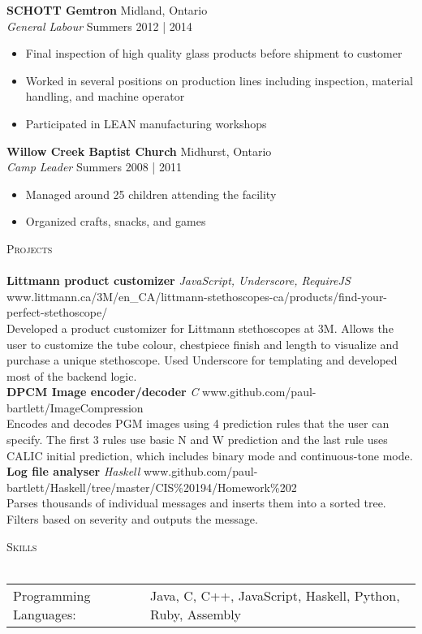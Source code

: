 \documentclass[a4paper]{article}
\newcommand{\lineunder} {
    \vspace*{-8pt} \\
    \hspace*{-18pt} \hrulefill \\
}
\newcommand{\header} [1] {
    {\hspace*{-18pt}\vspace*{6pt} \textsc{#1}}
    \vspace*{-6pt} \lineunder
}
\begin{document}
\textbf{SCHOTT Gemtron} \hfill Midland, Ontario\\
\textit{General Labour} \hfill Summers 2012 | 2014\\
\vspace{-1mm}
\begin{itemize} \itemsep 1pt
	\item Final inspection of high quality glass products before shipment to customer
	\item Worked in several positions on production lines including inspection, material handling, and machine operator
	\item Participated in LEAN manufacturing workshops
\end{itemize}

\textbf{Willow Creek Baptist Church} \hfill Midhurst, Ontario\\
\textit{Camp Leader} \hfill Summers 2008 | 2011\\
\vspace{-1mm}
\begin{itemize} \itemsep 1pt
	\item Managed around 25 children attending the facility
	\item Organized crafts, snacks, and games
\end{itemize}

\header{Projects}

{\textbf{Littmann product customizer} \sl JavaScript, Underscore, RequireJS} \hfill www.littmann.ca/3M/en\_CA/littmann-stethoscopes-ca/products/find-your-perfect-stethoscope/\\
\vspace*{1mm}
Developed a product customizer for Littmann stethoscopes at 3M. Allows the user to customize the tube colour, chestpiece finish and length to visualize and purchase a unique stethoscope. Used Underscore for templating and developed most of the backend logic.\\
\vspace*{2mm}
{\textbf{DPCM Image encoder/decoder} \sl C} \hfill www.github.com/paul-bartlett/ImageCompression\\
\vspace*{1mm}
Encodes and decodes PGM images using 4 prediction rules that the user can specify. The first 3 rules use basic N and W prediction and the last rule uses CALIC initial prediction, which includes binary mode and continuous-tone mode.\\
\vspace*{2mm}
{\textbf{Log file analyser} \sl Haskell} \hfill www.github.com/paul-bartlett/Haskell/tree/master/CIS\%20194/Homework\%202\\
\vspace*{1mm}
Parses thousands of individual messages and inserts them into a sorted tree. Filters based on severity and outputs the message.\\
\vspace*{2mm}

\vspace*{2mm}
        
\header{Skills}
\begin{tabular}{ l l }
	Programming Languages: & Java, C, C++, JavaScript, Haskell, Python, Ruby, Assembly \\
\end{tabular}

\vspace*{2mm}

\ 
\end{document}
